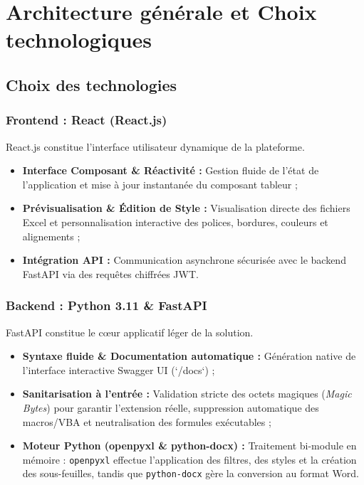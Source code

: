 \chapter{Architecture générale et Choix technologiques}

\section{Choix des technologies}

\subsection{Frontend : React (React.js)}

React.js constitue l'interface utilisateur dynamique de la plateforme.
\begin{itemize}
    \item \textbf{Interface Composant \& Réactivité :} Gestion fluide de l'état de l'application et mise à jour instantanée du composant tableur ;
    \item \textbf{Prévisualisation \& Édition de Style :} Visualisation directe des fichiers Excel et personnalisation interactive des polices, bordures, couleurs et alignements ;
    \item \textbf{Intégration API :} Communication asynchrone sécurisée avec le backend FastAPI via des requêtes chiffrées JWT.
\end{itemize}

\subsection{Backend : Python 3.11 \& FastAPI}

FastAPI constitue le cœur applicatif léger de la solution.
\begin{itemize}
    \item \textbf{Syntaxe fluide \& Documentation automatique :} Génération native de l'interface interactive Swagger UI (`/docs`) ;
    \item \textbf{Sanitarisation à l'entrée :} Validation stricte des octets magiques (\textit{Magic Bytes}) pour garantir l'extension réelle, suppression automatique des macros/VBA et neutralisation des formules exécutables ;
    \item \textbf{Moteur Python (openpyxl \& python-docx) :} Traitement bi-module en mémoire : \texttt{openpyxl} effectue l'application des filtres, des styles et la création des sous-feuilles, tandis que \texttt{python-docx} gère la conversion au format Word.
\end{itemize}

